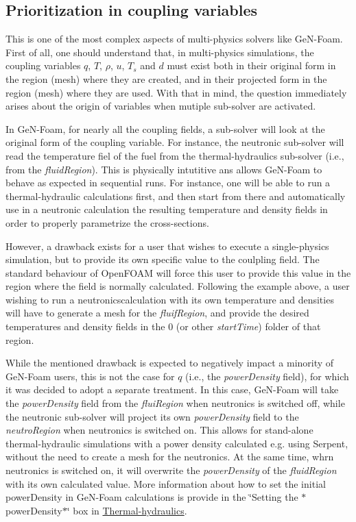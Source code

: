 \subsection*{Prioritization in coupling variables}

This is one of the most complex aspects of multi-\/physics solvers like Ge\+N-\/\+Foam. First of all, one should understand that, in multi-\/physics simulations, the coupling variables $q$, $T$, $\rho$, $u$, $T_s$ and $d$ must exist both in their original form in the region (mesh) where they are created, and in their projected form in the region (mesh) where they are used. With that in mind, the question immediately arises about the origin of variables when mutiple sub-\/solver are activated.

In Ge\+N-\/\+Foam, for nearly all the coupling fields, a sub-\/solver will look at the original form of the coupling variable. For instance, the neutronic sub-\/solver will read the temperature fiel of the fuel from the thermal-\/hydraulics sub-\/solver (i.\+e., from the {\itshape fluid\+Region}). This is physically intutitive ans allows Ge\+N-\/\+Foam to behave as expected in sequential runs. For instance, one will be able to run a thermal-\/hydraulic calculations first, and then start from there and automatically use in a neutronic calculation the resulting temperature and density fields in order to properly parametrize the cross-\/sections.

However, a drawback exists for a user that wishes to execute a single-\/physics simulation, but to provide its own specific value to the coulpling field. The standard behaviour of Open\+F\+O\+AM will force this user to provide this value in the region where the field is normally calculated. Following the example above, a user wishing to run a neutronicscalculation with its own temperature and densities will have to generate a mesh for the {\itshape fluif\+Region}, and provide the desired temperatures and density fields in the 0 (or other {\itshape start\+Time}) folder of that region.

While the mentioned drawback is expected to negatively impact a minority of Ge\+N-\/\+Foam users, this is not the case for $q$ (i.\+e., the {\itshape power\+Density} field), for which it was decided to adopt a separate treatment. In this case, Ge\+N-\/\+Foam will take the {\itshape power\+Density} field from the {\itshape flui\+Region} when neutronics is switched off, while the neutronic sub-\/solver will project its own {\itshape power\+Density} field to the {\itshape neutro\+Region} when neutronics is switched on. This allows for stand-\/alone thermal-\/hydraulic simulations with a power density calculated e.\+g. using Serpent, without the need to create a mesh for the neutronics. At the same time, whrn neutronics is switched on, it will overwrite the {\itshape power\+Density} of the {\itshape fluid\+Region} with its own calculated value. More information about how to set the initial power\+Density in Ge\+N-\/\+Foam calculations is provide in the \char`\"{}\+Setting the $\ast$power\+Density$\ast$\char`\"{} box in \hyperlink{TH}{Thermal-\/hydraulics}.

